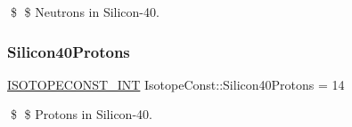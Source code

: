 \$ \$ Neutrons in Silicon-\/40. \mbox{\label{group___isotope_const-_silicon-_si40_ga27204a6a59c238b1f00c1f9e7df17332}} 
\subsubsection{\texorpdfstring{Silicon40\+Protons}{Silicon40Protons}}
{\footnotesize\ttfamily \mbox{\hyperlink{group___isotope_const-_macros_ga5f18360b3e99483a35c32d789e62621c}{I\+S\+O\+T\+O\+P\+E\+C\+O\+N\+S\+T\+\_\+\+I\+NT}} Isotope\+Const\+::\+Silicon40\+Protons = 14}

\$ \$ Protons in Silicon-\/40. 